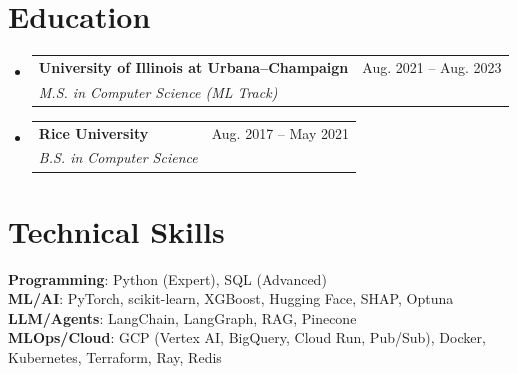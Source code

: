 \documentclass[letterpaper,11pt]{article}
\makeatletter
\newcommand{\resumeSubheading}[4]{
  \vspace{-2pt}\item
    \begin{tabular*}{0.97\textwidth}[t]{l@{\extracolsep{\fill}}r}
      \textbf{#1} & #2 \\
      \textit{\small#3} & \textit{\small #4} \\
    \end{tabular*}\vspace{-7pt}
}
\newcommand{\resumeSubHeadingListStart}{\begin{itemize}[leftmargin=0.15in, label={}]}
\newcommand{\resumeSubHeadingListEnd}{\end{itemize}}
\makeatother
\begin{document}
\section{Education}
  \resumeSubHeadingListStart
    \resumeSubheading
      {University of Illinois at Urbana–Champaign}{Aug. 2021 -- Aug. 2023}
      {M.S. in Computer Science (ML Track)}{ }
    \resumeSubheading
      {Rice University}{Aug. 2017 -- May 2021}
      {B.S. in Computer Science}{ }
  \resumeSubHeadingListEnd

\section{Technical Skills}
 \begin{itemize}[leftmargin=0.15in, label={}]
    \small{\item{
     \textbf{Programming}{: Python (Expert), SQL (Advanced)} \\
     \textbf{ML/AI}{: PyTorch, scikit-learn, XGBoost, Hugging Face, SHAP, Optuna} \\
     \textbf{LLM/Agents}{: LangChain, LangGraph, RAG, Pinecone} \\
     \textbf{MLOps/Cloud}{: GCP (Vertex AI, BigQuery, Cloud Run, Pub/Sub), Docker, Kubernetes, Terraform, Ray, Redis} \\
    }}
 \end{itemize}

\end{document}
